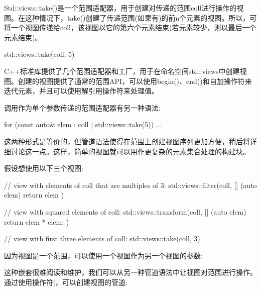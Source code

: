 Std::views::take()是一个范围适配器，用于创建对传递的范围coll进行操作的视图。在这种情况下，take()创建了传递范围(如果有)的前n个元素的视图。所以，可将一个视图传递给coll，该视图以它的第六个元素结束(若元素较少，则以最后一个元素结束)。

\begin{cpp}
std::views::take(coll, 5)
\end{cpp}

C++标准库提供了几个范围适配器和工厂，用于在命名空间std::views中创建视图。创建的视图提供了通常的范围API，可以使用begin()、end()和自加操作符来迭代元素，并且可以使用解引用操作符来处理值。


调用作为单个参数传递的范围适配器有另一种语法:

\begin{cpp}
for (const auto& elem : coll | std::views::take(5)) {
	...
}
\end{cpp}

这两种形式是等价的，但管道语法使得在范围上创建视图序列更加方便，稍后将详细讨论这一点。这样，简单的视图就可以用作更复杂的元素集合处理的构建块。

假设想使用以下三个视图:

\begin{cpp}
// view with elements of coll that are multiples of 3:
std::views::filter(coll, [] (auto elem) {
	return elem %
})

// view with squared elements of coll:
std::views::transform(coll, [] (auto elem) {
	return elem * elem;
})

// view with first three elements of coll:
std::views::take(coll, 3)
\end{cpp}

因为视图是一个范围，可以使用一个视图作为另一个视图的参数:


这种嵌套很难阅读和维护，我们可以从另一种管道语法中让视图对范围进行操作。通过使用操作符|，可以创建视图的管道:


